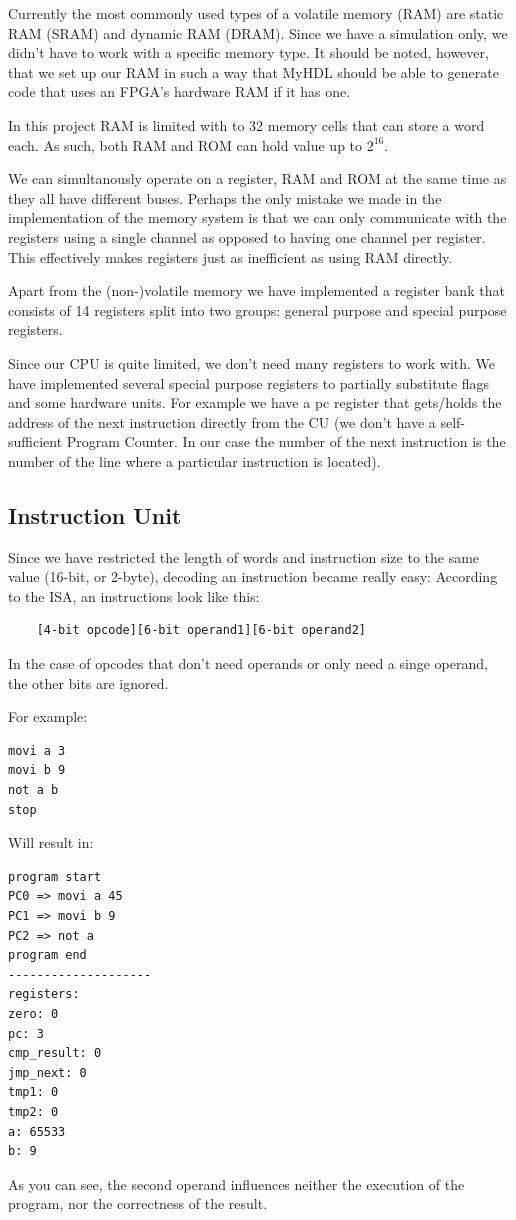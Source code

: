 \documentclass[12pt,a4paper]{scrartcl}
\begin{document}
Currently the most commonly used types of a volatile memory (RAM) are static RAM (SRAM) and dynamic RAM (DRAM). Since we have a simulation only, we didn't have to work with a specific memory type. It should be noted, however, that we set up our RAM in such a way that MyHDL should be able to generate code that uses an FPGA's hardware RAM if it has one.

In this project RAM is limited with to 32 memory cells that can store a word each. As such, both RAM and ROM can hold value up to $2^{16}$.

We can simultanously operate on a register, RAM and ROM at the same time as they all have different buses. Perhaps the only mistake we made in the implementation of the memory system is that we can only communicate with the registers using a single channel as opposed to having one channel per register. This effectively makes registers just as inefficient as using RAM directly.

Apart from the (non-)volatile memory we have implemented a register bank that consists of 14 registers split into two groups: general purpose and special purpose registers.

Since our CPU is quite limited, we don't need many registers to work with. We have implemented several special purpose registers to partially substitute flags and some hardware units. For example we have a pc register that gets/holds the address of the next instruction directly from the CU (we don't have a self-sufficient Program Counter. In our case the number of the next instruction is the number of the line where a particular instruction is located).

\subsection{Instruction Unit}
Since we have restricted the length of words and instruction size to the same value (16-bit, or 2-byte), decoding an instruction became really easy:
According to the ISA, an instructions look like this:
\begin{verbatim}
	[4-bit opcode][6-bit operand1][6-bit operand2]
\end{verbatim} 
In the case of opcodes that don't need operands or only need a singe operand, the other bits are ignored.

For example:

\begin{verbatim}
movi a 3
movi b 9
not a b
stop
\end{verbatim}
Will result in:
\begin{verbatim}
program start
PC0 => movi a 45
PC1 => movi b 9
PC2 => not a
program end
--------------------
registers:
zero: 0
pc: 3
cmp_result: 0
jmp_next: 0
tmp1: 0
tmp2: 0
a: 65533
b: 9
\end{verbatim}
As you can see, the second operand influences neither the execution of the program, nor the correctness of the result.
\end{document}
